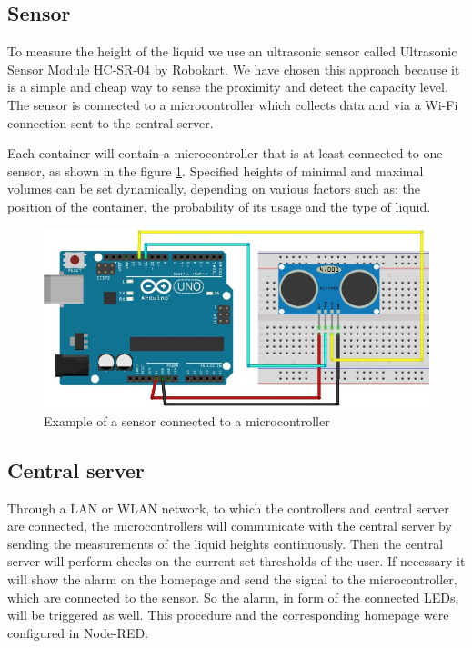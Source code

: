 \documentclass{article}
\begin{document}
\subsection{Sensor}
To measure the height of the liquid we use an ultrasonic sensor called Ultrasonic Sensor Module HC-SR-04 by Robokart. We have chosen this approach because it is a simple and cheap way to sense the proximity and detect the capacity level. The sensor is connected to a microcontroller which
collects data and via a Wi-Fi connection sent to the central server.

Each container will contain a microcontroller that is at least connected to one sensor, as shown in the figure \ref{sensorWithArduino}. Specified heights of minimal and maximal volumes can be set dynamically, depending on various factors such as: the position of the container, the probability of its usage and the type of liquid.

\begin{figure}[]
	\centering
  \includegraphics[scale=0.5]{sensorAndArduino.jpg}
  \caption{Example of a sensor connected to a microcontroller}
  \label{sensorWithArduino}
\end{figure}

\subsection{Central server}

Through a LAN or WLAN network, to which the controllers and central server are
connected, the microcontrollers will communicate with the central server by sending the measurements of the liquid heights continuously. Then the central server will perform checks on the current set thresholds of the user. If necessary it will show the alarm on the homepage and send the signal to the microcontroller, which are connected to the sensor. So the alarm, in form of the connected LEDs, will be triggered as well. This procedure and the corresponding homepage were configured in Node-RED.
\end{document}

